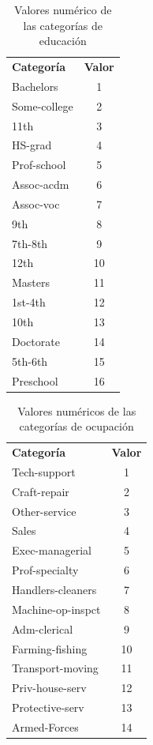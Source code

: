 \documentclass[10pt,twocolumn,a4paper]{article}
\begin{document}
\begin{table}[h!]
  \begin{center}
    \caption{Valores num\'erico de las categorías de educación }
    \label{tab:table1}
    \begin{tabular}{|l|c|} 
		\textbf{Categor\'ia} & \textbf{Valor} \\
		Bachelors   &1 \\
	    Some-college&2 \\
		11th        &3 \\
		HS-grad     &4 \\
	    Prof-school &5 \\
		Assoc-acdm  &6 \\
		Assoc-voc   &7 \\
		9th         &8 \\
	    7th-8th     &9 \\
		12th        &10 \\
		Masters     &11 \\
		1st-4th     &12 \\
		10th        &13 \\
		Doctorate   &14 \\
		5th-6th     &15 \\
		Preschool   &16 \\
      \hline
    \end{tabular}
  \end{center}
\end{table}

\begin{table}[h!]
  \begin{center}
	  \caption{Valores num\'ericos de las categorías de ocupaci\'on }
    \label{tab:table2}
    \begin{tabular}{|l|c|} 
		\textbf{Categor\'ia} & \textbf{Valor} \\
		 Tech-support      &1 \\
		 Craft-repair      &2 \\
		 Other-service     &3 \\
		 Sales             &4 \\
		 Exec-managerial   &5 \\
		 Prof-specialty    &6 \\
		 Handlers-cleaners &7 \\
		 Machine-op-inspct &8 \\
		 Adm-clerical      &9 \\
		 Farming-fishing   &10 \\
		 Transport-moving  &11 \\
		 Priv-house-serv   &12 \\
		 Protective-serv   &13 \\
		 Armed-Forces      &14 \\
           \hline
    \end{tabular}
  \end{center}
\end{table}
\end{document}
